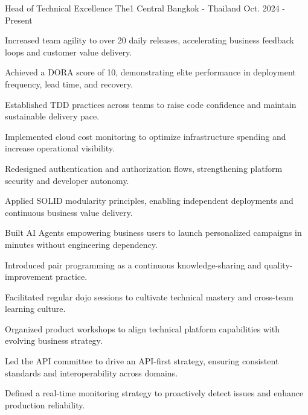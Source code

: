 

\begin{cventries}

  \cventry
    {Head of Technical Excellence} %
    {The1 Central} %
    {Bangkok - Thailand} %
    {Oct. 2024 - Present} %
    {
      \begin{cvitems} %
				\item {Increased team agility to over 20 daily releases, accelerating business feedback loops and customer value delivery.}
				\item {Achieved a DORA score of 10, demonstrating elite performance in deployment frequency, lead time, and recovery.}
				\item {Established TDD practices across teams to raise code confidence and maintain sustainable delivery pace.}
				\item {Implemented cloud cost monitoring to optimize infrastructure spending and increase operational visibility.}
				\item {Redesigned authentication and authorization flows, strengthening platform security and developer autonomy.}
				\item {Applied SOLID modularity principles, enabling independent deployments and continuous business value delivery.}
				\item {Built AI Agents empowering business users to launch personalized campaigns in minutes without engineering dependency.}
				\item {Introduced pair programming as a continuous knowledge-sharing and quality-improvement practice.}
				\item {Facilitated regular dojo sessions to cultivate technical mastery and cross-team learning culture.}
				\item {Organized product workshops to align technical platform capabilities with evolving business strategy.}
				\item {Led the API committee to drive an API-first strategy, ensuring consistent standards and interoperability across domains.}
				\item {Defined a real-time monitoring strategy to proactively detect issues and enhance production reliability.}

\end{cvitems}}
\end{cventries}
